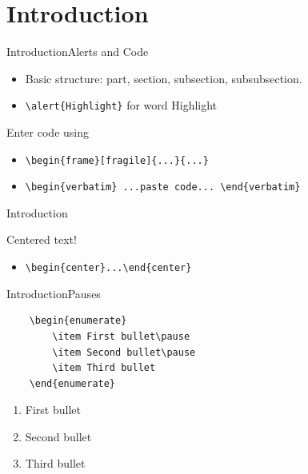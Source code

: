 \documentclass[hyperref={pdfpagelabels=false}]{beamer}
\begin{document}
\part{Introduction}
\frame{\partpage}
%

%
\begin{frame}[fragile]{Introduction}{Alerts and Code}
\begin{itemize}
\item Basic structure: part, section, subsection, subsubsection.
\item \verb+\alert{Highlight}+ for word \alert{Highlight}
\end{itemize}
Enter code using 
\begin{itemize}
\item  \verb+\begin{frame}[fragile]{...}{...}+
\item \verb+\begin{verbatim} ...paste code... \end{verbatim}+
\end{itemize}
\end{frame}	

\begin{frame}[fragile]{Introduction}
\begin{center}Centered text!\end{center}
\begin{itemize}
    \item \verb+\begin{center}...\end{center}+ 
\end{itemize}
\end{frame}	

\begin{frame}[fragile]{Introduction}{Pauses}
\begin{verbatim}
    \begin{enumerate}
        \item First bullet\pause
        \item Second bullet\pause
        \item Third bullet
    \end{enumerate}
\end{verbatim}
    \begin{enumerate}
        \item First bullet\pause
        \item Second bullet\pause
        \item Third bullet
    \end{enumerate}
\end{frame}
\end{document}

